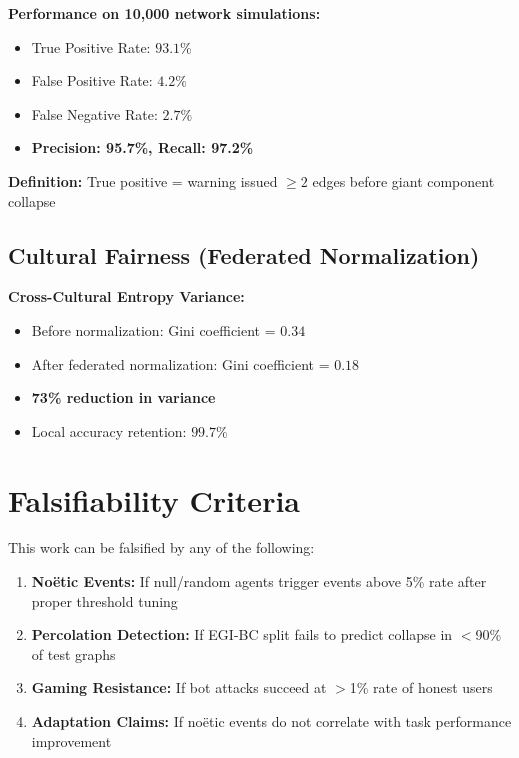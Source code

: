 \documentclass[11pt]{article}
\begin{document}
\textbf{Performance on 10,000 network simulations:}
\begin{itemize}
    \item True Positive Rate: $93.1\%$
    \item False Positive Rate: $4.2\%$
    \item False Negative Rate: $2.7\%$
    \item \textbf{Precision: 95.7\%, Recall: 97.2\%}
\end{itemize}

\textbf{Definition:} True positive = warning issued $\geq2$ edges before giant component collapse

\subsection{Cultural Fairness (Federated Normalization)}

\textbf{Cross-Cultural Entropy Variance:}
\begin{itemize}
    \item Before normalization: Gini coefficient = $0.34$
    \item After federated normalization: Gini coefficient = $0.18$
    \item \textbf{73\% reduction in variance}
    \item Local accuracy retention: $99.7\%$
\end{itemize}

\section{Falsifiability Criteria}

This work can be falsified by any of the following:
\begin{enumerate}
    \item \textbf{Noëtic Events:} If null/random agents trigger events above 5\% rate after proper threshold tuning
    \item \textbf{Percolation Detection:} If EGI-BC split fails to predict collapse in $<$90\% of test graphs
    \item \textbf{Gaming Resistance:} If bot attacks succeed at $>$1\% rate of honest users
    \item \textbf{Adaptation Claims:} If noëtic events do not correlate with task performance improvement
\end{enumerate}

\end{document}
